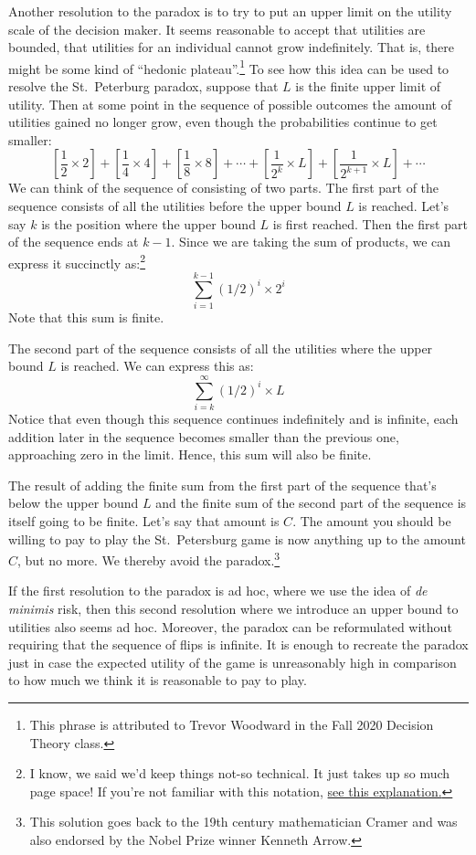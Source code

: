 \documentclass[]{tufte-book}
\begin{document}
Another resolution to the paradox is to try to put an upper limit on the utility scale of the decision maker. It seems reasonable to accept that utilities are bounded, that utilities for an individual cannot grow indefinitely. That is, there might be some kind of ``hedonic plateau''.\footnote{This phrase is attributed to Trevor Woodward in the Fall 2020 Decision Theory class.} To see how this idea can be used to resolve the St.~Peterburg paradox, suppose that \(L\) is the finite upper limit of utility. Then at some point in the sequence of possible outcomes the amount of utilities gained no longer grow, even though the probabilities continue to get smaller:
\[
\left[\frac{1}{2}\times 2\right] + \left[ \frac{1}{4}\times 4 \right] + \left[\frac{1}{8}\times 8 \right] + \cdots + \left[\frac{1}{2^k}\times L\right] + \left[\frac{1}{2^{k+1}} \times L\right] + \cdots
\]
We can think of the sequence of consisting of two parts. The first part of the sequence consists of all the utilities before the upper bound \(L\) is reached. Let's say \(k\) is the position where the upper bound \(L\) is first reached. Then the first part of the sequence ends at \(k-1\). Since we are taking the sum of products, we can express it succinctly as:\footnote{I know, we said we'd keep things not-so technical. It just takes up so much page space! If you're not familiar with this notation, \href{https://mathinsight.org/definition/summation_symbol}{see this explanation.}}
\[
\sum_{i=1}^{k-1} (1/2)^i \times 2^i
\]
Note that this sum is finite.

The second part of the sequence consists of all the utilities where the upper bound \(L\) is reached. We can express this as:
\[
\sum_{i=k}^{\infty} (1/2)^i \times L
\]
Notice that even though this sequence continues indefinitely and is infinite, each addition later in the sequence becomes smaller than the previous one, approaching zero in the limit. Hence, this sum will also be finite.

The result of adding the finite sum from the first part of the sequence that's below the upper bound \(L\) and the finite sum of the second part of the sequence is itself going to be finite. Let's say that amount is \(C\). The amount you should be willing to pay to play the St.~Petersburg game is now anything up to the amount \(C\), but no more. We thereby avoid the paradox.\footnote{This solution goes back to the 19th century mathematician Cramer and was also endorsed by the Nobel Prize winner Kenneth Arrow.}

If the first resolution to the paradox is ad hoc, where we use the idea of \emph{de minimis} risk, then this second resolution where we introduce an upper bound to utilities also seems ad hoc. Moreover, the paradox can be reformulated without requiring that the sequence of flips is infinite. It is enough to recreate the paradox just in case the expected utility of the game is unreasonably high in comparison to how much we think it is reasonable to pay to play.
\end{document}
